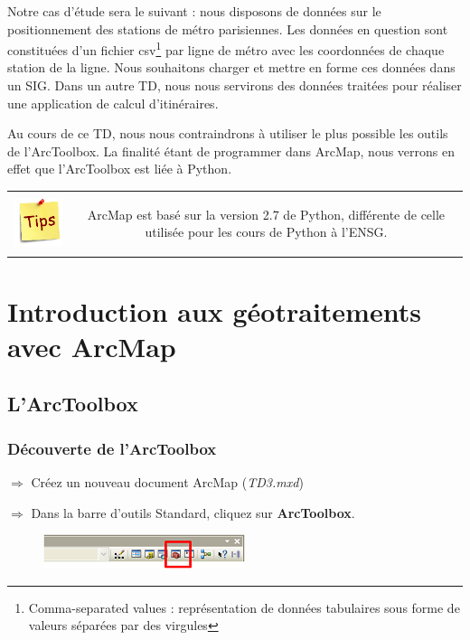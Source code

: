 \documentclass[11pt]{article}
\newcommand{\action}{$\Rightarrow$ }
\newenvironment{note}{%
	\begin{tabular}[t t]{c c}
		\includegraphics{img/tips.png}
		 &
		\begin{minipage}[c]{0.9\linewidth}
			\begin{sffamily}
}{%
			\end{sffamily}
		\end{minipage}
	\end{tabular}
}
\begin{document}
Notre cas d'étude sera le suivant : nous disposons de données sur le positionnement des stations de métro parisiennes. Les données en question sont constituées d'un fichier csv\footnote{Comma-separated values : représentation de données tabulaires sous forme de valeurs séparées par des virgules} par ligne de métro avec les coordonnées de chaque station de la ligne. Nous souhaitons charger et mettre en forme ces données dans un SIG. Dans un autre TD, nous nous servirons des données traitées pour réaliser une application de calcul d'itinéraires.

Au cours de ce TD, nous nous contraindrons à utiliser le plus possible les outils de l'ArcToolbox. La finalité étant de programmer dans ArcMap, nous verrons en effet que l'ArcToolbox est liée à Python.

\begin{note}
ArcMap est basé sur la version 2.7 de Python, différente de celle utilisée pour les cours de Python à l'ENSG.
\end{note}



\section{Introduction aux géotraitements avec ArcMap}

\subsection{L'ArcToolbox}
\subsubsection{Découverte de l'ArcToolbox}
\action Créez un nouveau document ArcMap (\textit{TD3.mxd})

\action Dans la barre d'outils Standard, cliquez sur \textbf{ArcToolbox}.
\begin{figure}[H]
	\center \includegraphics{img/td3/arctoolbox_bouton.png}\\
\end{figure}
\end{document}
